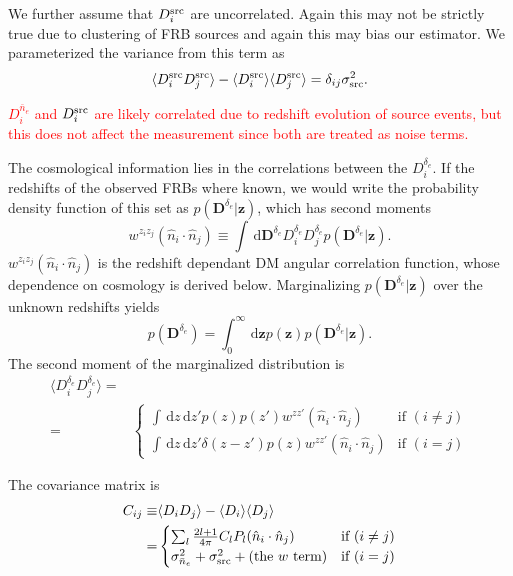 \documentclass[onecolumn,prd,noshowpacs,nofootinbib,amsmath,amssymb]{revtex4}
\newcommand{\ud}{\,\mathrm{d}}
\newcommand{\red}{\textcolor{red}}
\begin{document}
We further assume that $D^{\rm src}_i$ are uncorrelated. Again this may not
be strictly true due to clustering of FRB sources and again this may bias our
estimator. We parameterized the variance from this term as 
\begin{equation}
    \label{e:sig_src}
    \langle D^{\rm src}_i D^{\rm src}_j \rangle
    - \langle D^{\rm src}_i \rangle \langle D^{\rm src}_j \rangle
    = \delta_{ij} \sigma^2_{\rm src}.
\end{equation}

\red{$D^{\bar{n}_e}_i$ and $D^{\rm src}_i$ are likely correlated due to
    redshift evolution of source events, but this does not affect the
    measurement since both are treated as noise terms.}

The cosmological information lies in the correlations between the
$D^{\delta_e}_i$. If the redshifts of the observed FRBs where known, we
would write the probability density function of this set as
$p(\boldsymbol D^{\delta_e} | \boldsymbol z)$, which has second moments
\begin{equation}
    w^{z_i z_j}(\hat{n}_i\cdot\hat{n}_j) \equiv \int \ud \boldsymbol D^{\delta_e}
        D^{\delta_e}_i D^{\delta_e}_j p(\boldsymbol D^{\delta_e} | \boldsymbol z).
\end{equation}
$w^{z_i z_j}(\hat{n}_i\cdot\hat{n}_j)$ is the redshift dependant DM angular
correlation function, whose dependence on cosmology is derived below.
Marginalizing $p(\boldsymbol D^{\delta_e} | \boldsymbol z)$ over the unknown redshifts
yields
\begin{equation}
    p(\boldsymbol D^{\delta_e}) = \int_0^\infty \ud \boldsymbol z
        p(\boldsymbol z) p(\boldsymbol D^{\delta_e} | \boldsymbol z).
\end{equation}
The second moment of the marginalized distribution is
\begin{align}
    \langle D^{\delta_e}_i D^{\delta_e}_j \rangle =& \\
        =&
        \begin{cases}
            \int \ud z \ud z' p(z) p(z') w^{z z'}(\hat{n}_i\cdot\hat{n}_j) 
                &  \text{if } (i \neq j) \\
            \int \ud z \ud z' \delta(z - z') p(z) w^{z z'}(\hat{n}_i\cdot\hat{n}_j)
                &  \text{if } (i = j)
        \end{cases}
\end{align}

The covariance matrix is
\begin{align}
    C_{ij} \equiv& \langle D_i D_j \rangle - \langle D_i \rangle \langle D_j
    \rangle\\
    =&
        \begin{cases}
            \sum_l \frac{2l+1}{4 \pi} C_l P_l(\hat{n}_i\cdot\hat{n}_j)
                &  \text{if } (i \neq j) \\
            \sigma_{\bar{n}_e}^2 + \sigma^2_{\rm src}
                + \textrm{(the $w$ term)}
                &  \text{if } (i = j)
        \end{cases}
\end{align}
\end{document}
